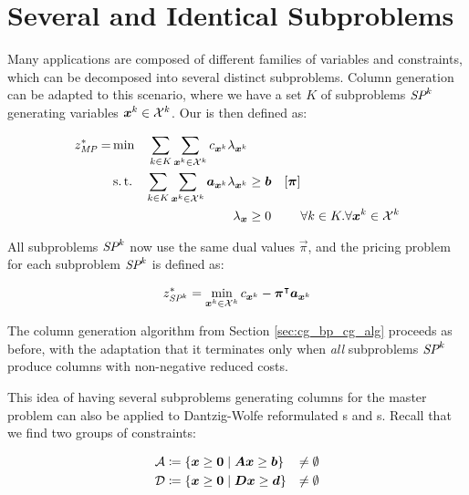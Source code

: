 \section{Several and Identical Subproblems}\label{sec:cg_bp_idsp}
Many applications are composed of different families of variables and constraints, which can be decomposed into several distinct subproblems. Column generation can be adapted to this scenario, where we have a set $K$ of subproblems $\SP{k}$ generating variables ${\bm{x}}^k \in \mathcal{X}^k$. Our \MP{} is then defined as:

\begin{equation}
\begin{aligned}
z^*_{\textit{MP}}{} = &\min & \sum_{k \in K}\sum_{{\bm{x}}^k \in \mathcal{X}^k} c_{{\bm{x}}^k} \lambda_{{\bm{x}}^k} & & & \\
&\operatorname{s.t.} & \sum_{k \in K}\sum_{{\bm{x}}^k \in \mathcal{X}^k} {\bm{a}}_{{\bm{x}}^k} \lambda_{{\bm{x}}^k} & \geq {\bm{b}} & \left[{\bm{\pi}}\right] & \\
&& \lambda_{\bm{x}} & \geq 0 & & \forall k \in K. \forall {{\bm{x}}^k} \in \mathcal{X}^k
\end{aligned}
\end{equation}

All subproblems $\SP{k}$ now use the same dual values $\vec{\pi}$, and the pricing problem for each subproblem $\SP{k}$ is defined as:

\begin{equation}
\begin{aligned}
z^*_\SP{k} = \underset{\vec{x}^k \in \indexset{X}^k}{\min} \, c_{\vec{x}^k} - \vec{\pi}\transpose \vec{a}_{\vec{x}^k}
\end{aligned}
\end{equation}

The column generation algorithm from Section \ref{sec:cg_bp_cg_alg} proceeds as before, with the adaptation that it terminates only when \textit{all} subproblems $\SP{k}$ produce columns with non-negative reduced costs.

This idea of having several subproblems generating columns for the master problem can also be applied to Dantzig-Wolfe reformulated \LP{}s and \IP{}s. Recall that we find two groups of constraints:

\begin{equation}
\begin{aligned}
\mathcal{A} &\coloneqq \left\{ {\bm{x}} \geq {\bm{0}} \mid {\bm{A}} {\bm{x}} \geq {\bm{b}} \right\} &\neq \emptyset \\
\mathcal{D} &\coloneqq \left\{ {\bm{x}} \geq {\bm{0}} \mid {\bm{D}} {\bm{x}} \geq {\bm{d}} \right\} &\neq \emptyset
\end{aligned}
\end{equation}

